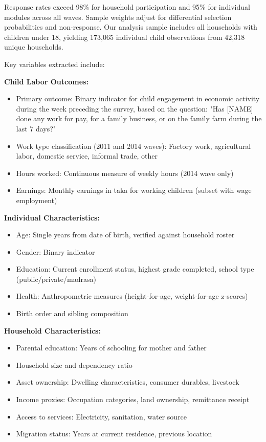 \documentclass[12pt]{article}
\begin{document}
Response rates exceed 98\% for household participation and 95\% for individual modules across all waves. Sample weights adjust for differential selection probabilities and non-response. Our analysis sample includes all households with children under 18, yielding 173,065 individual child observations from 42,318 unique households.

Key variables extracted include:

\textbf{Child Labor Outcomes:}
\begin{itemize}
\item Primary outcome: Binary indicator for child engagement in economic activity during the week preceding the survey, based on the question: "Has [NAME] done any work for pay, for a family business, or on the family farm during the last 7 days?"
\item Work type classification (2011 and 2014 waves): Factory work, agricultural labor, domestic service, informal trade, other
\item Hours worked: Continuous measure of weekly hours (2014 wave only)
\item Earnings: Monthly earnings in taka for working children (subset with wage employment)
\end{itemize}

\textbf{Individual Characteristics:}
\begin{itemize}
\item Age: Single years from date of birth, verified against household roster
\item Gender: Binary indicator
\item Education: Current enrollment status, highest grade completed, school type (public/private/madrasa)
\item Health: Anthropometric measures (height-for-age, weight-for-age z-scores)
\item Birth order and sibling composition
\end{itemize}

\textbf{Household Characteristics:}
\begin{itemize}
\item Parental education: Years of schooling for mother and father
\item Household size and dependency ratio
\item Asset ownership: Dwelling characteristics, consumer durables, livestock
\item Income proxies: Occupation categories, land ownership, remittance receipt
\item Access to services: Electricity, sanitation, water source
\item Migration status: Years at current residence, previous location
\end{itemize}
\end{document}

